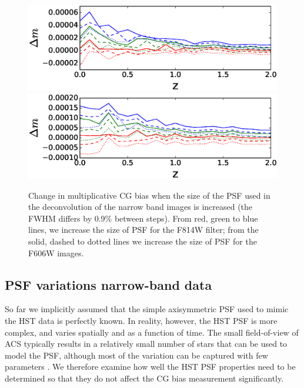 \documentclass[useAMS,usenatbib]{mnras}
\begin{document}
\begin{figure}
\includegraphics[width=\hsize]{varpsfB.eps}
\includegraphics[width=\hsize]{varpsfS.eps}
\caption{Change in multiplicative CG bias when the size of the PSF used in the deconvolution
of the narrow band images is increased (the FWHM differs by 0.9\% between steps). From red, 
green to blue lines, we increase the size of PSF for the F814W filter; from the solid, dashed to dotted 
lines we  increase the size of PSF for the F606W images.}
\label{fig:psfacc1}
\end{figure}

\subsection{PSF variations narrow-band data}

So far we implicitly assumed that the simple axisymmetric PSF used to mimic the HST data
is perfectly known. In reality, however, the HST PSF is more complex, and varies spatially
and as a function of time. The small field-of-view of ACS typically results in a relatively small number
of stars that can be used to model the PSF, although most of the variation can be captured with
few parameters \citep[e.g.][]{Schrabback10}. We therefore examine how well the HST PSF 
properties need to be determined so that they do not affect the CG bias measurement significantly. 
\end{document}
